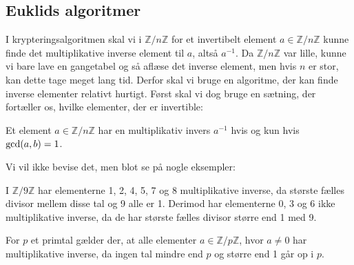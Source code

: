 \subsection*{Euklids algoritmer}
I krypteringsalgoritmen skal vi i $\mathbb{Z}/n\mathbb{Z}$ for et invertibelt element $a\in \mathbb{Z}/n\mathbb{Z}$ kunne finde det multiplikative inverse element til $a$, altså $a^{-1}$. Da $\mathbb{Z}/n\mathbb{Z}$ var lille, kunne vi bare lave en gangetabel og så aflæse det inverse element, men hvis $n$ er stor, kan dette tage meget lang tid. Derfor skal vi bruge en algoritme, der kan finde inverse elementer relativt hurtigt. Først skal vi dog bruge en sætning, der fortæller os, hvilke elementer, der er invertible:
\begin{setn}
	Et element  $a\in \mathbb{Z}/n\mathbb{Z}$ har en multiplikativ invers $a^{-1}$ hvis og kun hvis 
	$\textnormal{gcd}(a,b)= 1$. 
\end{setn}
Vi vil ikke bevise det, men blot se på nogle eksempler:
\begin{exa}
I $\mathbb{Z}/9\mathbb{Z}$ har elementerne 1, 2, 4, 5, 7 og 8 multiplikative inverse, da største fælles divisor mellem disse tal og 9 alle er 1. Derimod har elementerne 0, 3 og 6 ikke multiplikative inverse, da de har største fælles divisor større end 1 med 9.
\end{exa}
\begin{exa}
For $p$ et primtal gælder der,  at alle elementer $a\in \mathbb{Z}/p\mathbb{Z}$, hvor $a\neq 0$ har multiplikative inverse, da ingen tal mindre end $p$ og større end 1 går op i $p$. 
\end{exa}


